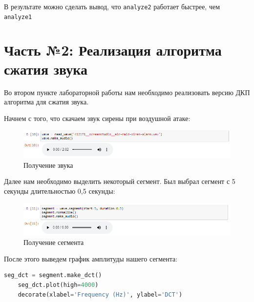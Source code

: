 \documentclass[a4paper]{article}
\begin{document}
            В результате можно сделать вывод, что \texttt{analyze2} работает быстрее, чем \\ \texttt{analyze1}
    
    \newpage
        \section{Часть №2: Реализация алгоритма сжатия звука}
            Во втором пункте лабораторной работы нам необходимо реализовать версию ДКП алгоритма для сжатия звука.
            
            Начнем с того, что скачаем звук сирены при воздушной атаке:
            
             \begin{figure}[H]
                \centering
                \includegraphics[width=\textwidth]{ex_2_audio.png}
                \caption{Получение звука}
                \label{fig:ex_2_audio}
            \end{figure}
            
            Далее нам необходимо выделить некоторый сегмент. Был выбрал сегмент с 5 секунды длительностью 0,5 секунды:
            
            \begin{figure}[H]
                \centering
                \includegraphics[width=\textwidth]{ex_2_segment.png}
                \caption{Получение сегмента}
                \label{fig:ex_2_segment}
            \end{figure}
            
            После этого выведем график амплитуды нашего сегмента:
            
\begin{lstlisting}[language=Python, caption= Полученние графика амплитуды сегмента]
    seg_dct = segment.make_dct()
    seg_dct.plot(high=4000)
    decorate(xlabel='Frequency (Hz)', ylabel='DCT')
\end{lstlisting}               
            
\end{document}
